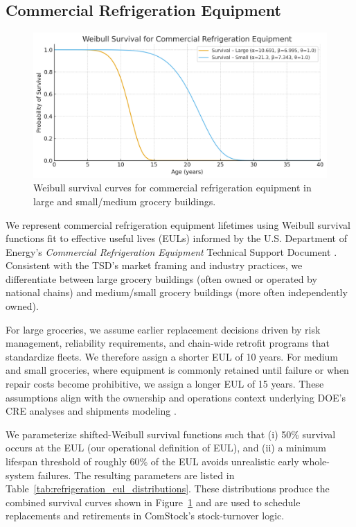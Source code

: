 \subsection{Commercial Refrigeration Equipment}
\label{sec:refrigeration_survival}

\begin{figure}[ht!]
  \centering
  \includegraphics[width=\textwidth]{figures/refrigeration_survival_curves_combined.png}
  \caption[Survival curves for commercial refrigeration equipment]{Weibull survival curves for commercial refrigeration equipment in large and small/medium grocery buildings.}
  \label{fig:refrigeration_survival_curves}
\end{figure}

We represent commercial refrigeration equipment lifetimes using Weibull survival functions fit to effective useful lives (EULs) informed by the U.S. Department of Energy’s \emph{Commercial Refrigeration Equipment} Technical Support Document \citep{doe_cre_tsd}. Consistent with the TSD’s market framing and industry practices, we differentiate between large grocery buildings (often owned or operated by national chains) and medium/small grocery buildings (more often independently owned).

For large groceries, we assume earlier replacement decisions driven by risk management, reliability requirements, and chain-wide retrofit programs that standardize fleets. We therefore assign a shorter EUL of 10 years. For medium and small groceries, where equipment is commonly retained until failure or when repair costs become prohibitive, we assign a longer EUL of 15 years. These assumptions align with the ownership and operations context underlying DOE’s CRE analyses and shipments modeling \citep{doe_cre_tsd}.

We parameterize shifted-Weibull survival functions such that (i) 50\% survival occurs at the EUL (our operational definition of EUL), and (ii) a minimum lifespan threshold of roughly 60\% of the EUL avoids unrealistic early whole-system failures. The resulting parameters are listed in Table~\ref{tab:refrigeration_eul_distributions}. These distributions produce the combined survival curves shown in Figure~\ref{fig:refrigeration_survival_curves} and are used to schedule replacements and retirements in ComStock’s stock-turnover logic.

